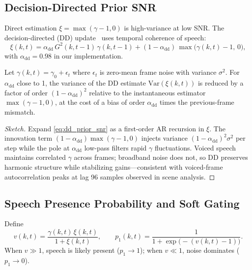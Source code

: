 \subsection{Decision-Directed Prior SNR}

Direct estimation $\xi=\max(\gamma-1,0)$ is high-variance at low SNR. The decision-directed (DD) update~\cite{ephraim2005} uses temporal coherence of speech:
\begin{equation}
  \xi(k,t) = \alpha_{\mathrm{dd}}\, G^2(k,t{-}1)\,\gamma(k,t{-}1)
           + (1-\alpha_{\mathrm{dd}})\,\max\bigl(\gamma(k,t)-1,\, 0\bigr),
  \label{eq:dd_prior_snr}
\end{equation}
with $\alpha_{\mathrm{dd}}=0.98$ in our implementation.

\begin{proposition}
\label{prop:dd_variance}
Let $\gamma(k,t)=\gamma_0+\epsilon_t$ where $\epsilon_t$ is zero-mean frame noise with variance $\sigma^2$. For $\alpha_{\mathrm{dd}}$ close to 1, the variance of the DD estimate $\mathrm{Var}(\xi(k,t))$ is reduced by a factor of order $(1-\alpha_{\mathrm{dd}})^2$ relative to the instantaneous estimator $\max(\gamma-1,0)$, at the cost of a bias of order $\alpha_{\mathrm{dd}}$ times the previous-frame mismatch.
\end{proposition}

\begin{proof}[Sketch]
Expand \eqref{eq:dd_prior_snr} as a first-order AR recursion in $\xi$. The innovation term $(1-\alpha_{\mathrm{dd}})\max(\gamma-1,0)$ injects variance $(1-\alpha_{\mathrm{dd}})^2\sigma^2$ per step while the pole at $\alpha_{\mathrm{dd}}$ low-pass filters rapid $\gamma$ fluctuations. Voiced speech maintains correlated $\gamma$ across frames; broadband noise does not, so DD preserves harmonic structure while stabilizing gains---consistent with voiced-frame autocorrelation peaks at lag 96 samples observed in scene analysis.
\end{proof}

\subsection{Speech Presence Probability and Soft Gating}

Define
\begin{equation}
  v(k,t) = \frac{\gamma(k,t)\,\xi(k,t)}{1+\xi(k,t)}, \qquad
  p_1(k,t) = \frac{1}{1+\exp\bigl(-(v(k,t)-1)\bigr)}.
  \label{eq:speech_presence}
\end{equation}
When $v\gg 1$, speech is likely present ($p_1\to 1$); when $v\ll 1$, noise dominates ($p_1\to 0$).

